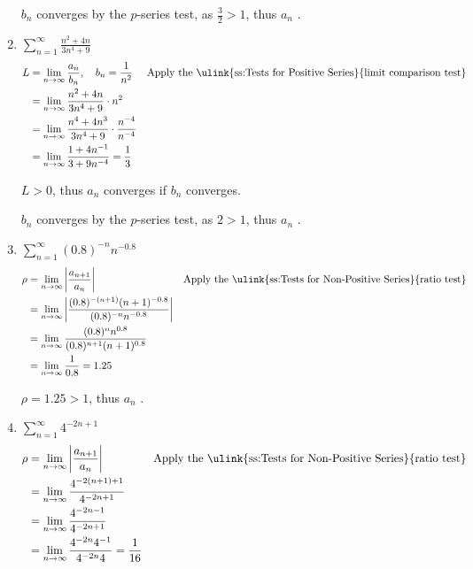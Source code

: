 \begin{enumerate}[itemsep=12em]
    \(b_n\) converges by the \(p\)-series test, as \(\frac{3}{2} > 1\), thus
    \(a_n\) .


  \item \(\displaystyle \sum_{n=1}^{\infty} \frac{n^2 + 4n}{3n^4 + 9} \)
    \begin{align*}
      L &= \lim_{n \to \infty} \frac{a_n}{b_n}, \quad b_n = \frac{1}{n^2}
      && \text{Apply the \ulink{ss:Tests for Positive Series}{limit comparison test}} \\
      &= \lim_{n \to \infty} \frac{n^2 + 4n}{3n^4 + 9} \cdot n^2 \\
      &= \lim_{n \to \infty} \frac{n^4 + 4n^3}{3n^4 + 9} \cdot \frac{n^{-4}}{n^{-4}} \\
      &= \lim_{n \to \infty} \frac{1 + 4n^{-1}}{3 + 9n^{-4}} = \frac{1}{3}
    \end{align*}

    \(L > 0\), thus \(a_n\) converges if \(b_n\) converges.

    \(b_n\) converges by the \(p\)-series test, as \(2 > 1\), thus
    \(a_n\) .

  \item \(\displaystyle \sum_{n=1}^{\infty} (0.8)^{-n} n^{-0.8}  \)
    \begin{align*}
      \rho &= \lim_{n \to \infty} \left| \frac{a_{n+1}}{a_n}  \right|
     && \text{Apply the \ulink{ss:Tests for Non-Positive Series}{ratio test}} \\
     &= \lim_{n \to \infty}
     \left|  \frac{(0.8)^{-(n+1)} (n+1)^{-0.8}}{(0.8)^{-n} n^{-0.8}} \right| \\
     &= \lim_{n \to \infty}  \frac{(0.8)^{n} n^{0.8}}{(0.8)^{n+1} (n+1)^{0.8}} \\
     &= \lim_{n \to \infty}  \frac{1}{0.8} = 1.25
    \end{align*}

    \(\rho = 1.25 > 1 \), thus \(a_n\) .

  \item \(\displaystyle \sum_{n=1}^{\infty} 4^{-2n+1}  \)
    \begin{align*}
      \rho &= \lim_{n \to \infty} \left| \frac{a_{n+1}}{a_n}  \right|
           && \text{Apply the \ulink{ss:Tests for Non-Positive Series}{ratio test}} \\
           &= \lim_{n \to \infty} \frac{4^{-2(n+1) + 1}}{4^{-2n+1} } \\
           &= \lim_{n \to \infty} \frac{4^{-2n-1}}{4^{-2n+1} } \\
           &= \lim_{n \to \infty} \frac{4^{-2n} 4^{-1}}{4^{-2n}4} = \frac{1}{16}
    \end{align*}


\end{enumerate}
